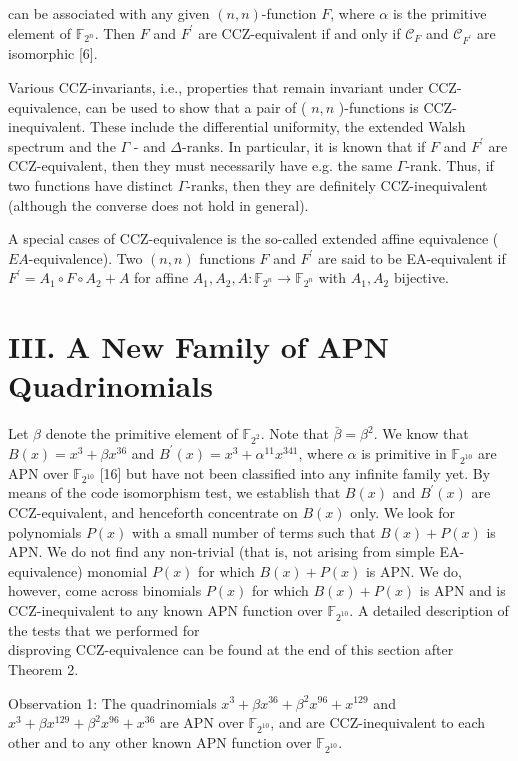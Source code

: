 \documentclass[10pt]{article}
\begin{document}
can be associated with any given $(n, n)$-function $F$, where $\alpha$ is the primitive element of $\mathbb{F}_{2^{n}}$. Then $F$ and $F^{\prime}$ are CCZ-equivalent if and only if $\mathcal{C}_{F}$ and $\mathcal{C}_{F^{\prime}}$ are isomorphic [6].

Various CCZ-invariants, i.e., properties that remain invariant under CCZ-equivalence, can be used to show that a pair of ( $n, n$ )-functions is CCZ-inequivalent. These include the differential uniformity, the extended Walsh spectrum and the $\Gamma$ - and $\Delta$-ranks. In particular, it is known that if $F$ and $F^{\prime}$ are CCZ-equivalent, then they must necessarily have e.g. the same $\Gamma$-rank. Thus, if two functions have distinct $\Gamma$-ranks, then they are definitely CCZ-inequivalent (although the converse does not hold in general).

A special cases of CCZ-equivalence is the so-called extended affine equivalence ( $E A$-equivalence). Two $(n, n)$ functions $F$ and $F^{\prime}$ are said to be EA-equivalent if $F^{\prime}=A_{1} \circ F \circ A_{2}+A$ for affine $A_{1}, A_{2}, A: \mathbb{F}_{2^{n}} \rightarrow \mathbb{F}_{2^{n}}$ with $A_{1}, A_{2}$ bijective.

\section*{III. A New Family of APN Quadrinomials}
Let $\beta$ denote the primitive element of $\mathbb{F}_{2^{2}}$. Note that $\bar{\beta}=\beta^{2}$. We know that $B(x)=x^{3}+\beta x^{36}$ and $B^{\prime}(x)=x^{3}+\alpha^{11} x^{341}$, where $\alpha$ is primitive in $\mathbb{F}_{2^{10}}$ are APN over $\mathbb{F}_{2^{10}}$ [16] but have not been classified into any infinite family yet. By means of the code isomorphism test, we establish that $B(x)$ and $B^{\prime}(x)$ are CCZ-equivalent, and henceforth concentrate on $B(x)$ only. We look for polynomials $P(x)$ with a small number of terms such that $B(x)+P(x)$ is APN. We do not find any non-trivial (that is, not arising from simple EA-equivalence) monomial $P(x)$ for which $B(x)+P(x)$ is APN. We do, however, come across binomials $P(x)$ for which $B(x)+P(x)$ is APN and is CCZ-inequivalent to any known APN function over $\mathbb{F}_{2^{10}}$. A detailed description of the tests that we performed for\\
disproving CCZ-equivalence can be found at the end of this section after Theorem 2.

Observation 1: The quadrinomials $x^{3}+\beta x^{36}+\beta^{2} x^{96}+x^{129}$ and $x^{3}+\beta x^{129}+\beta^{2} x^{96}+x^{36}$ are APN over $\mathbb{F}_{2^{10}}$, and are CCZ-inequivalent to each other and to any other known APN function over $\mathbb{F}_{2^{10}}$.
\end{document}
